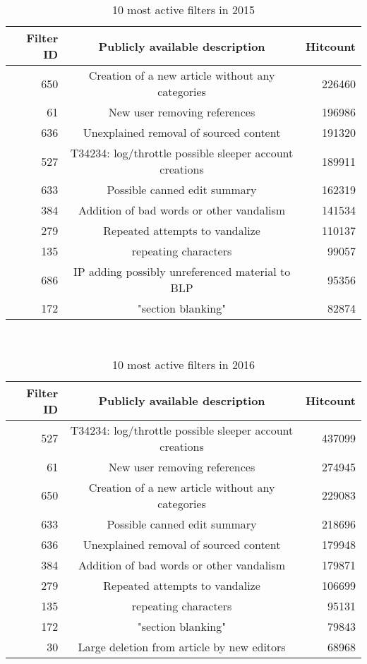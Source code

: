 \begin{table}
  \centering
  \begin{tabular}{r c r }
    Filter ID & Publicly available description & Hitcount \\
    \hline
    650 & Creation of a new article without any categories & 226460 \\
    61 & New user removing references & 196986 \\
    636 & Unexplained removal of sourced content & 191320 \\
    527 & T34234: log/throttle possible sleeper account creations & 189911 \\
    633 & Possible canned edit summary & 162319 \\
    384 & Addition of bad words or other vandalism & 141534 \\
    279 & Repeated attempts to vandalize & 110137 \\
    135 & repeating characters & 99057 \\
    686 & IP adding possibly unreferenced material to BLP & 95356 \\
    172 & "section blanking" & 82874 \\
  \end{tabular}
  \caption{10 most active filters in 2015}~\label{tab:app-most-active-2015}
\end{table}

\begin{table}
  \centering
  \begin{tabular}{r c r }
    Filter ID & Publicly available description & Hitcount \\
    \hline
    527 & T34234: log/throttle possible sleeper account creations & 437099 \\
    61 & New user removing references & 274945 \\
    650 & Creation of a new article without any categories & 229083 \\
    633 & Possible canned edit summary & 218696 \\
    636 & Unexplained removal of sourced content & 179948 \\
    384 & Addition of bad words or other vandalism & 179871 \\
    279 & Repeated attempts to vandalize & 106699 \\
    135 & repeating characters & 95131 \\
    172 & "section blanking" & 79843 \\
    30 & Large deletion from article by new editors & 68968 \\
  \end{tabular}
  \caption{10 most active filters in 2016}~\label{tab:app-most-active-2016}
\end{table}

